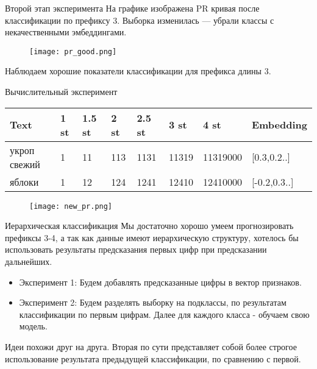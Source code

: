 \documentclass{beamer}
\begin{document}
\begin{frame}{Второй этап эксперимента}
На графике изображена PR кривая после классификации по префиксу 3. Выборка изменилась --- убрали классы с некачественными эмбеддингами.
\begin{figure}[]
\centering
\texttt{[image: pr\_good.png]}
\end{figure}

Наблюдаем хорошие показатели классификации для префикса длины 3.
\end{frame}

\begin{frame}{Вычислительный эксперимент}
\scriptsize %

\begin{table}[htb]
\centering
\begin{tabular}{|l|l|l|l|l|l|l|l|}
\hline
\textbf{Text}  & \textbf{1 st} & \textbf{1.5 st} & \textbf{2 st} & \textbf{2.5 st} & \textbf{3 st} & \textbf{4 st} & \textbf{Embedding} \\ \hline
укроп свежий  & 1 & 11 & 113 & 1131 & 11319 & 11319000 & [0.3,0.2..] \\ \hline
яблоки  & 1 & 12 & 124 & 1241 & 12410 & 12410000 & [-0.2,0.3..] \\ \hline
\end{tabular}
\end{table}

\vspace{1em} %

\begin{figure}[htb]
\centering
\texttt{[image: new\_pr.png]}
\end{figure}

\end{frame}

\begin{frame}{Иерархическая классификация}
 Мы достаточно хорошо умеем прогнозировать префиксы 3-4, а так как данные имеют иерархическую структуру, хотелось бы использовать результаты предсказания первых цифр при предсказании дальнейших.
\begin{itemize}
    \item Эксперимент 1: Будем добавлять предсказанные цифры в вектор признаков. 
    \item Эксперимент 2: Будем разделять выборку на подклассы, по результатам классификации по первым цифрам. Далее для каждого класса - обучаем свою модель. 
    
\end{itemize}
Идеи похожи друг на друга. Вторая по сути представляет собой более строгое использование результата предыдущей классификации, по сравнению с первой.
\end{frame}
\end{document}
